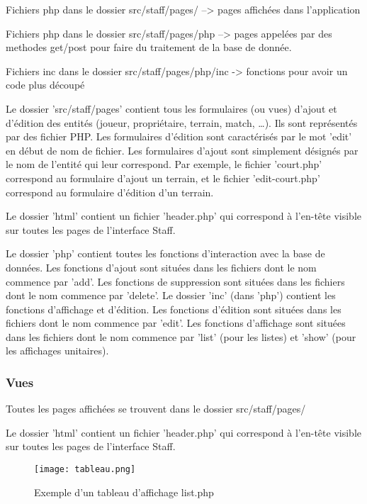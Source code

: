 \documentclass{article}
\begin{document}
Fichiers php dans le dossier src/staff/pages/ –> pages affichées dans l'application

Fichiers php dans le dossier src/staff/pages/php –> pages appelées par des methodes get/post pour faire du traitement de la base de donnée.

Fichiers inc dans le dossier src/staff/pages/php/inc -> fonctions pour avoir un code plus découpé

Le dossier 'src/staff/pages' contient tous les formulaires (ou vues) d'ajout et d'édition des entités (joueur, propriétaire, terrain, match, …). Ils sont représentés par des fichier PHP. Les formulaires d'édition sont caractérisés par le mot 'edit' en début de nom de fichier. Les formulaires d'ajout sont simplement désignés par le nom de l'entité qui leur correspond. Par exemple, le fichier 'court.php' correspond au formulaire d'ajout un terrain, et le fichier 'edit-court.php' correspond au formulaire d'édition d'un terrain.

Le dossier 'html' contient un fichier 'header.php' qui correspond à l'en-tête visible sur toutes les pages de l'interface Staff.

Le dossier 'php' contient toutes les fonctions d'interaction avec la base de données. Les fonctions d'ajout sont situées dans les fichiers dont le nom commence par 'add'. Les fonctions de suppression sont situées dans les fichiers dont le nom commence par 'delete'.
Le dossier 'inc' (dans 'php') contient les fonctions d'affichage et d'édition. Les fonctions d'édition sont situées dans les fichiers dont le nom commence par 'edit'. Les fonctions d'affichage sont situées dans les fichiers dont le nom commence par 'list' (pour les listes) et 'show' (pour les affichages unitaires).


\subsubsection{Vues}

Toutes les pages affichées se trouvent dans le dossier src/staff/pages/

Le dossier 'html' contient un fichier 'header.php' qui correspond à l'en-tête visible sur toutes les pages de l'interface Staff.



\begin{figure}[h!]
\centering
\texttt{[image: tableau.png]}
\caption{Exemple d'un tableau d'affichage list.php}
\end{figure}
\end{document}
